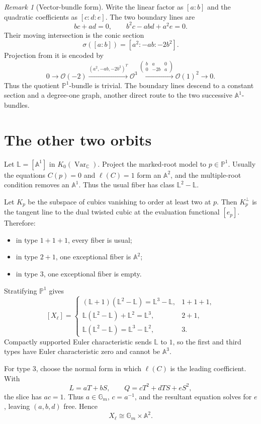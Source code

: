 \documentclass[11pt]{article}
\newcommand{\A}{\mathbb A}
\newcommand{\C}{\mathbb C}
\newcommand{\Gm}{\mathbb G_m}
\newcommand{\Pj}{\mathbb P}
\newcommand{\Lef}{\mathbb L}
\theoremstyle{remark}
\newtheorem{remark}[theorem]{Remark}
\begin{document}
\begin{remark}[Vector-bundle form]
Write the linear factor as $[a:b]$ and the quadratic coefficients as
$[c:d:e]$. The two boundary lines are
\[
bc+ad=0,\qquad b^2c-abd+a^2e=0.
\]
Their moving intersection is the conic section
\[
\sigma([a:b])=[a^2:-ab:-2b^2].
\]
Projection from it is encoded by
\[
0\to\mathcal O(-2)
\xrightarrow{(a^2,-ab,-2b^2)^T}\mathcal O^3
\xrightarrow{\left(\begin{smallmatrix}b&a&0\\0&-2b&a\end{smallmatrix}\right)}
\mathcal O(1)^2\to0.
\]
Thus the quotient $\Pj^1$-bundle is trivial. The boundary lines descend to a
constant section and a degree-one graph, another direct route to the two
successive $\A^1$-bundles.
\end{remark}

\section{The other two orbits}

Let $\Lef=[\A^1]$ in $K_0(\operatorname{Var}_{\C})$. Project the marked-root
model to $p\in\Pj^1$. Usually the equations $C(p)=0$ and $\ell(C)=1$ form an
$\A^2$, and the multiple-root condition removes an $\A^1$. Thus the usual
fiber has class $\Lef^2-\Lef$.

Let $K_p$ be the subspace of cubics vanishing to order at least two at $p$.
Then $K_p^\perp$ is the tangent line to the dual twisted cubic at the evaluation
functional $[e_p]$. Therefore:
\begin{itemize}[leftmargin=2em]
\item in type $1+1+1$, every fiber is usual;
\item in type $2+1$, one exceptional fiber is $\A^2$;
\item in type $3$, one exceptional fiber is empty.
\end{itemize}
Stratifying $\Pj^1$ gives
\[
[X_\ell]=
\begin{cases}
(\Lef+1)(\Lef^2-\Lef)=\Lef^3-\Lef,&1+1+1,\\
\Lef(\Lef^2-\Lef)+\Lef^2=\Lef^3,&2+1,\\
\Lef(\Lef^2-\Lef)=\Lef^3-\Lef^2,&3.
\end{cases}
\]
Compactly supported Euler characteristic sends $\Lef$ to $1$, so the first
and third types have Euler characteristic zero and cannot be $\A^3$.

For type $3$, choose the normal form in which $\ell(C)$ is the leading
coefficient. With
\[
L=aT+bS,\qquad Q=cT^2+dTS+eS^2,
\]
the slice has $ac=1$. Thus $a\in\Gm$, $c=a^{-1}$, and the resultant equation
solves for $e$, leaving $(a,b,d)$ free. Hence
\[
X_\ell\cong\Gm\times\A^2.
\]
\end{document}
